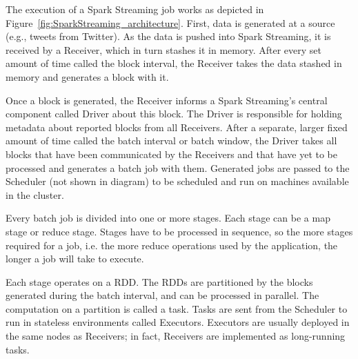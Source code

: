 The execution of a Spark Streaming job works as depicted in Figure~\ref{fig:SparkStreaming_architecture}. 
First, data is generated at a source (e.g., tweets from Twitter). As the data is pushed into Spark Streaming, it is received by a Receiver, which in turn stashes it in memory. After every set amount of time called the block interval, the Receiver takes the data stashed in memory and generates a block with it.

Once a block is generated, the Receiver informs a Spark Streaming's central component called Driver about this block. The Driver is responsible for holding metadata about reported blocks from all Receivers.
After a separate, larger fixed amount of time called the batch interval or batch window, the Driver takes all blocks that have been communicated by the Receivers and that have yet to be processed and generates a batch job with them. Generated jobs are passed to the Scheduler (not shown in diagram) to be scheduled and run on machines available in the cluster.

Every batch job is divided into one or more stages. Each stage can be a map stage or reduce stage. Stages have to be processed in sequence, so the more stages required for a job, i.e. the more reduce operations used by the application, the longer a job will take to execute.

Each stage operates on a RDD. The RDDs are partitioned by the blocks generated during the batch interval, and can be processed in parallel. The computation on a partition is called a task. Tasks are sent from the Scheduler to run in stateless environments called Executors. Executors are usually deployed in the same nodes as Receivers; in fact, Receivers are implemented as long-running tasks.

